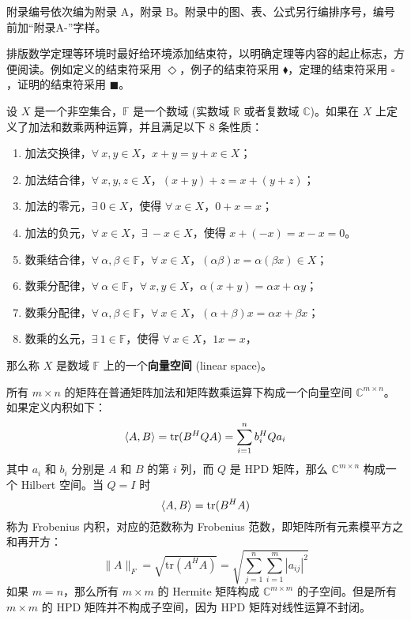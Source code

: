

附录编号依次编为附录 A，附录 B。附录中的图、表、公式另行编排序号，编号前加“附录A-”字样。

排版数学定理等环境时最好给环境添加结束符，以明确定理等内容的起止标志，方便阅读。例如定义的结束符采用 $\Diamond$，例子的结束符采用 $\blacklozenge$，定理的结束符采用 $\square$，证明的结束符采用 $\blacksquare$。

\begin{definition}[向量空间]
	设 $X$ 是一个非空集合，$\mathbb{F}$ 是一个数域 (实数域 $\mathbb{R}$ 或者复数域 $\mathbb{C}$)。如果在 $X$ 上定义了加法和数乘两种运算，并且满足以下 8 条性质：
	\begin{enumerate}
		\item 加法交换律，$\forall~x,y \in X$，$x+y = y+x \in X$；
		\item 加法结合律，$\forall~x,y,z \in X$，$(x+y)+z = x+(y+z)$；
		\item 加法的零元，$\exists~0 \in X$，使得 $\forall~x \in X$，$0+x = x$；
		\item 加法的负元，$\forall~x \in X$，$\exists~-x \in X$，使得 $x+(-x) = x-x = 0$。
		\item 数乘结合律，$\forall~\alpha,\beta \in \mathbb{F}$，$\forall~x \in X$，$(\alpha\beta)x = \alpha(\beta x) \in X$；
		\item 数乘分配律，$\forall~\alpha \in \mathbb{F}$，$\forall~x,y \in X$，$\alpha(x+y) = \alpha x + \alpha y$；
		\item 数乘分配律，$\forall~\alpha,\beta \in \mathbb{F}$，$\forall~x \in X$，$(\alpha+\beta)x = \alpha x + \beta x$；
		\item 数乘的幺元，$\exists~1 \in \mathbb{F}$，使得 $\forall~x \in X$，$1 x = x$，
	\end{enumerate}
	那么称 $X$ 是数域 $\mathbb{F}$ 上的一个\textbf{向量空间} (linear space)。
\end{definition}

\begin{example}[矩阵空间]
	所有 $m\times n$ 的矩阵在普通矩阵加法和矩阵数乘运算下构成一个向量空间 $\mathbb{C}^{m\times n}$。如果定义内积如下：
	\begin{equation}
	\langle A,B \rangle = \mathrm{tr}(B^H Q A) = \sum_{i=1}^{n} b_i^H Q a_i
	\end{equation}
	其中 $a_i$ 和 $b_i$ 分别是 $A$ 和 $B$ 的第 $i$ 列，而 $Q$ 是 HPD 矩阵，那么 $\mathbb{C}^{m\times n}$ 构成一个 Hilbert 空间。当 $Q=I$ 时
	\begin{equation}
	\langle A,B \rangle = \mathrm{tr}(B^H A)
	\end{equation}
	称为 Frobenius 内积，对应的范数称为 Frobenius 范数，即矩阵所有元素模平方之和再开方：
	\begin{equation} \label{equ_chap1_frob_norm}
	\|A\|_F = \sqrt{\mathrm{tr}(A^H A)} = \sqrt{\sum_{j=1}^{n}\sum_{i=1}^{m} |a_{ij}|^2}
	\end{equation}
	如果 $m=n$，那么所有 $m\times m$ 的 Hermite 矩阵构成 $\mathbb{C}^{m\times m}$ 的子空间。但是所有 $m\times m$ 的 HPD 矩阵并不构成子空间，因为 HPD 矩阵对线性运算不封闭。
\end{example}

